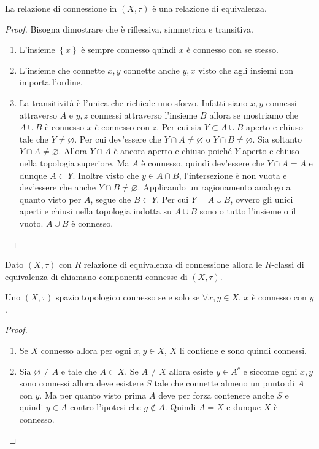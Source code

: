 \begin{lemma}
	La relazione di connessione in $(X, \tau)$ è una relazione di equivalenza. 
\end{lemma} 
\begin{proof}
	Bisogna dimostrare che è riflessiva, simmetrica e transitiva.
	\begin{enumerate}
		\item	L'insieme $\left\{x\right\}$ è sempre connesso quindi $x$ è connesso con se stesso.
		\item L'insieme che connette $x,y$ connette anche $y,x$ visto che agli insiemi non importa l'ordine.
		\item La transitività è l'unica che richiede uno sforzo. Infatti siano $x,y$ connessi attraverso $A$ e $y,z$ connessi attraverso l'insieme $B$ allora se mostriamo che $A \cup B$ è connesso $x$ è connesso con $z$. Per cui sia $Y \subset A \cup B$ aperto e chiuso tale che $Y \neq \varnothing$. Per cui dev'essere che $Y \cap A \neq \varnothing$ o $Y \cap B \neq \varnothing$. Sia soltanto $Y \cap A \neq \varnothing$. Allora $Y \cap A$ è ancora aperto e chiuso poiché $Y$ aperto e chiuso nella topologia superiore. Ma $A$ è connesso, quindi dev'essere che $Y \cap A = A$ e dunque $A \subset Y$. Inoltre visto che $y\in A \cap B$, l'intersezione è non vuota e dev'essere che anche $Y \cap B \neq \varnothing$. Applicando un ragionamento analogo a quanto visto per $A$, segue che $B \subset Y$. Per cui $Y = A \cup B$, ovvero gli unici aperti e chiusi nella topologia indotta su $A \cup B$ sono o tutto l'insieme o il vuoto. $A \cup B$ è connesso.
	\end{enumerate}
\end{proof}

\begin{definition}
	Dato $(X, \tau)$ con $R$ relazione di equivalenza di connessione allora le $R$-classi di equivalenza di chiamano componenti connesse di $(X, \tau)$.
\end{definition} 

\begin{theorem}
	\label{thr:3.21.4}
	Uno $(X, \tau)$ spazio topologico connesso se e solo se $\forall x, y \in X$, $x$ è connesso con $y$.
\end{theorem} 
\begin{proof}
	\begin{enumerate}
		\item Se $X$ connesso allora per ogni $x, y \in X$, $X$ li contiene e sono quindi connessi. 
		\item Sia $\varnothing \neq A$ e tale che $A \subset X$. Se $A \neq X$ allora esiste $y \in A^c$ e siccome ogni $x, y$ sono connessi allora deve esistere $S$ tale che connette almeno un punto di $A$ con $y$. Ma per quanto visto prima $A$ deve per forza contenere anche $S$ e quindi $y \in A$ contro l'ipotesi che $g \notin A$. Quindi $A = X$ e dunque $X$ è connesso. 
	\end{enumerate}
\end{proof}

